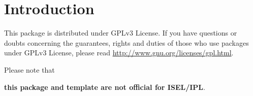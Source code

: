 % 
%  
%
\chapter{Introduction}
\label{cha:introduction}

This package is distributed under GPLv3 License. If you have questions or  doubts concerning the guarantees, rights and duties of those who use packages under GPLv3 License, please read \url{http://www.gnu.org/licenses/gpl.html}.


Please note that
\begin{center}
    \textbf{\large this package and template are not official for ISEL/IPL}.
\end{center}

